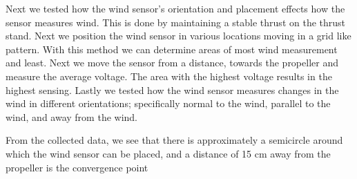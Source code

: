 \documentclass[twocolumn]{article}
\begin{document}

Next we tested how the wind sensor's orientation and placement effects how the sensor measures wind. This is done by maintaining a stable thrust on the thrust stand. Next we position the wind sensor in various locations moving in a grid like pattern. With this method we can determine areas of most wind measurement and least. Next we move the sensor from a distance, towards the propeller and measure the average voltage. The area with the highest voltage results in the highest sensing. Lastly we tested how the wind sensor measures changes in the wind in different orientations; specifically normal to the wind, parallel to the wind, and away from the wind. 


From the collected data, we see that there is approximately a semicircle around which the wind sensor can be placed, and a distance of 15 cm away from the propeller is the convergence point 
\end{document}
